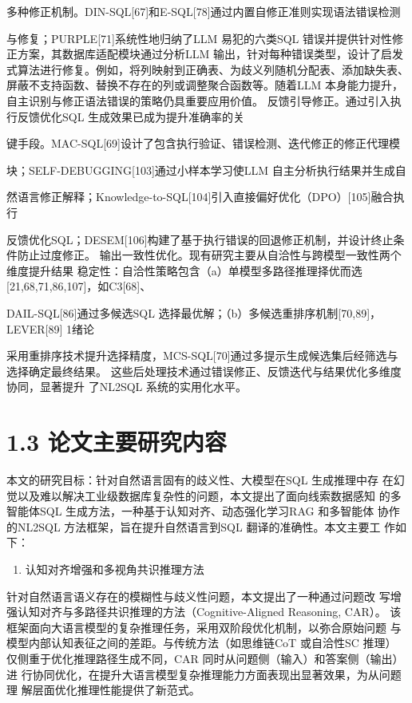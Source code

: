 \documentclass[12pt,a4paper,openright,UTF8]{ctexbook}
\begin{document}
多种修正机制。DIN-SQL[67]和E-SQL[78]通过内置自修正准则实现语法错误检测

与修复；PURPLE[71]系统性地归纳了LLM 易犯的六类SQL 错误并提供针对性修 正方案，其数据库适配模块通过分析LLM 输出，针对每种错误类型，设计了启发 式算法进行修复。例如，将列映射到正确表、为歧义列随机分配表、添加缺失表、 屏蔽不支持函数、替换不存在的列或调整聚合函数等。随着LLM 本身能力提升， 自主识别与修正语法错误的策略仍具重要应用价值。 反馈引导修正。通过引入执行反馈优化SQL 生成效果已成为提升准确率的关

键手段。MAC-SQL[69]设计了包含执行验证、错误检测、迭代修正的修正代理模

块；SELF-DEBUGGING[103]通过小样本学习使LLM 自主分析执行结果并生成自

然语言修正解释；Knowledge-to-SQL[104]引入直接偏好优化（DPO）[105]融合执行

反馈优化SQL；DESEM[106]构建了基于执行错误的回退修正机制，并设计终止条 件防止过度修正。 输出一致性优化。现有研究主要从自洽性与跨模型一致性两个维度提升结果 稳定性：自洽性策略包含（a）单模型多路径推理择优而选[21,68,71,86,107]，如C3[68]、

DAIL-SQL[86]通过多候选SQL 选择最优解；（b）多候选重排序机制[70,89]，LEVER[89] 1绪论

采用重排序技术提升选择精度，MCS-SQL[70]通过多提示生成候选集后经筛选与 选择确定最终结果。 这些后处理技术通过错误修正、反馈迭代与结果优化多维度协同，显著提升 了NL2SQL 系统的实用化水平。

\section{1.3 论文主要研究内容}

本文的研究目标：针对自然语言固有的歧义性、大模型在SQL 生成推理中存 在幻觉以及难以解决工业级数据库复杂性的问题，本文提出了面向线索数据感知 的多智能体SQL 生成方法，一种基于认知对齐、动态强化学习RAG 和多智能体 协作的NL2SQL 方法框架，旨在提升自然语言到SQL 翻译的准确性。本文主要工 作如下：

\begin{enumerate}[label=(\arabic*)]
\item 认知对齐增强和多视角共识推理方法
\end{enumerate}
针对自然语言语义存在的模糊性与歧义性问题，本文提出了一种通过问题改 写增强认知对齐与多路径共识推理的方法（Cognitive-Aligned Reasoning, CAR）。 该框架面向大语言模型的复杂推理任务，采用双阶段优化机制，以弥合原始问题 与模型内部认知表征之间的差距。与传统方法（如思维链CoT 或自洽性SC 推理） 仅侧重于优化推理路径生成不同，CAR 同时从问题侧（输入）和答案侧（输出）进 行协同优化，在提升大语言模型复杂推理能力方面表现出显著效果，为从问题理 解层面优化推理性能提供了新范式。
\end{document}
